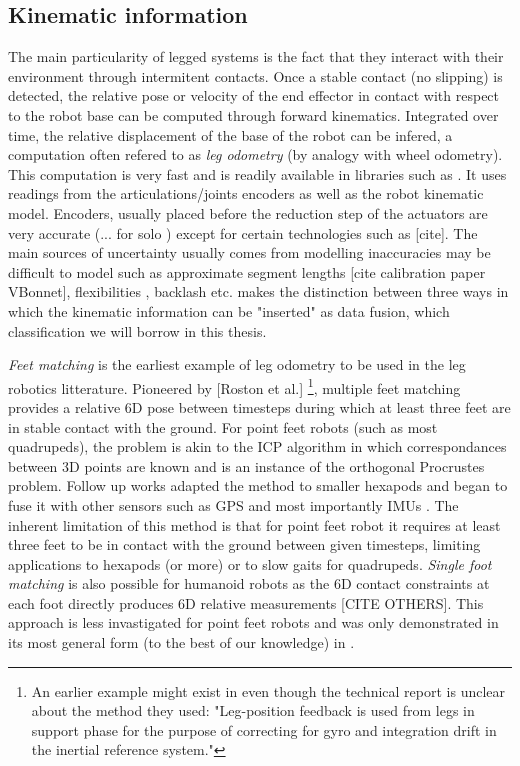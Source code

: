 \subsection{Kinematic information}
The main particularity of legged systems is the fact that they interact with their environment through intermitent contacts.
Once a stable contact (no slipping) is detected, the relative pose or velocity of the end effector in contact with respect to the robot base 
can be computed through forward kinematics. Integrated over time, the relative displacement of the base of the robot can be infered, a computation 
often refered to as \textit{leg odometry} (by analogy with wheel odometry). This computation is very fast and is readily available in libraries such as \cite{carpentier2019pinocchio, hereid2017frost}. It uses
readings from the articulations/joints encoders as well as the robot kinematic model. Encoders, usually placed before the reduction step of the actuators
are very accurate (... for solo \cite{grimminger2020open}) except for certain technologies such as [cite]. The main sources of uncertainty usually comes from
modelling inaccuracies may be difficult to model such as approximate segment lengths [cite calibration paper VBonnet], flexibilities \cite{vigne2018estimation}, backlash \cite{fallon2014drift} etc. 
\cite{bloesch2018technical} makes the distinction between three ways in which the kinematic information can be "inserted" as data fusion, 
which classification we will borrow in this thesis. 


\textit{Feet matching} is the earliest example of leg odometry to be used in the leg robotics litterature. Pioneered by [Roston et al.] 
\footnote{An earlier example might exist in \cite{roston1991dead} even though the technical report is unclear about the method they used: 
"Leg-position feedback is used from legs in support phase for the purpose of correcting for gyro and integration drift in the inertial reference system."},
multiple feet matching provides a relative 6D pose between timesteps during which at least three feet are in stable contact with the ground.
For point feet robots (such as most quadrupeds), the problem is akin to the ICP algorithm in which correspondances between 3D points are known and is an instance of the orthogonal Procrustes problem.
Follow up works adapted the method to smaller hexapods \cite{lin2005leg} and began to fuse it with other sensors such as GPS \cite{gassmann2005localization, cobano2008location} 
and most importantly IMUs \cite{lin2006sensor, reinstein2011dead}.
The inherent limitation of this method is that for point feet robot it requires at least three feet to be in contact with the ground between given timesteps, limiting
applications to hexapods (or more) or to slow gaits for quadrupeds.
\textit{Single foot matching} is also possible for humanoid robots as the 6D contact constraints at each foot directly produces 6D 
relative measurements \cite{flayols2017experimental} [CITE OTHERS]. This approach is less invastigated for point feet robots and was only 
demonstrated in its most general form (to the best of our knowledge) in \cite{fourmy2021contact}.

